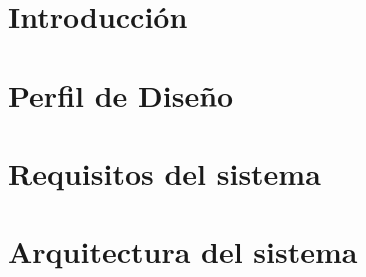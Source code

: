 \documentclass[conference, onecolumn]{IEEEtran}
\begin{document}
\newpage


\tableofcontents


\newpage



\section{Introducción}






\newpage

\section{Perfil de Diseño}











\newpage

\section{Requisitos del sistema}






\newpage

\section{Arquitectura del sistema}
\end{document}
